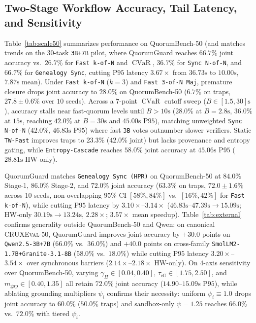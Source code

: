 \documentclass[conference]{IEEEtran}
\def\QG{QuorumGuard}%
\def\QBench{QuorumBench-50}%
\theoremstyle{definition}
\theoremstyle{remark}
\newcommand{\QG}{\textsc{QuorumGuard}}
\newcommand{\QBench}{\textsc{QuorumBench-50}}
\newcommand{\CVaR}{\operatorname{CVaR}}
\begin{document}
\subsection{Two-Stage Workflow Accuracy, Tail Latency, and Sensitivity}
Table~\ref{tab:scale50} summarizes performance on \QBench{} (and matches trends on the 30-task \texttt{3B+7B} pilot, where \QG{} reaches $66.7\%$ joint accuracy vs.\ $26.7\%$ for \texttt{Fast k-of-N} and $\CVaR$, $36.7\%$ for \texttt{Sync N-of-N}, and $66.7\%$ for \texttt{Genealogy Sync}, cutting $\mathrm{P95}$ latency $3.67\times$ from $36.73\text{s}$ to $10.00\text{s}$, $7.87\text{s}$ mean). Under \texttt{Fast k-of-N} ($k = 3$) and \texttt{Fast 3-of-N Maj}, premature closure drops joint accuracy to $28.0\%$ on \QBench{} ($6.7\%$ on traps, $27.8\pm 0.6\%$ over $10$ seeds). Across a $7$-point $\CVaR$ cutoff sweep ($B \in [1.5, 30]\text{s}$), accuracy stalls near fast-quorum levels until $B > 10\text{s}$ ($28.0\%$ at $B=2.8\text{s}$, $36.0\%$ at $15\text{s}$, reaching $42.0\%$ at $B=30\text{s}$ and $45.00\text{s}$ $\mathrm{P95}$), matching unweighted \texttt{Sync N-of-N} ($42.0\%$, $46.83\text{s}$ $\mathrm{P95}$) where fast \texttt{3B} votes outnumber slower verifiers. Static \texttt{TW-Fast} improves traps to $23.3\%$ ($42.0\%$ joint) but lacks provenance and entropy gating, while \texttt{Entropy-Cascade} reaches $58.0\%$ joint accuracy at $45.06\text{s}$ $\mathrm{P95}$ ($28.81\text{s}$ HW-only).

\QG{} matches \texttt{Genealogy Sync (HPR)} on \QBench{} at $84.0\%$ Stage-1, $86.0\%$ Stage-2, and $72.0\%$ joint accuracy ($63.3\%$ on traps, $72.0\pm 1.6\%$ across $10$ seeds, non-overlapping $95\%$ CI $[58\%, 84\%]$ vs.\ $[16\%, 42\%]$ for \texttt{Fast k-of-N}), while cutting $\mathrm{P95}$ latency by $3.10\times$--$3.14\times$ ($46.83\text{s}$--$47.39\text{s} \to 15.09\text{s}$; HW-only $30.19\text{s} \to 13.24\text{s}$, $2.28\times$; $3.57\times$ mean speedup). Table~\ref{tab:external} confirms generality outside \QBench{} and Qwen: on canonical \textsc{CRUXEval-50}, \QG{} improves joint accuracy by $+30.0$ points on \texttt{Qwen2.5-3B+7B} ($66.0\%$ vs.\ $36.0\%$) and $+40.0$ points on cross-family \texttt{SmolLM2-1.7B+Granite-3.1-8B} ($58.0\%$ vs.\ $18.0\%$) while cutting $\mathrm{P95}$ latency $3.20\times$--$3.54\times$ over synchronous barriers ($2.14\times$--$2.18\times$ HW-only). On $4$-axis sensitivity over \QBench{}, varying $\gamma_H \in [0.04, 0.40]$, $\tau_{\mathrm{eff}} \in [1.75, 2.50]$, and $m_{\mathrm{gap}} \in [0.40, 1.35]$ all retain $72.0\%$ joint accuracy ($14.90$--$15.09\text{s}$ $\mathrm{P95}$), while ablating grounding multipliers $\psi_i$ confirms their necessity: uniform $\psi_i \equiv 1.0$ drops joint accuracy to $60.0\%$ ($50.0\%$ traps) and sandbox-only $\psi = 1.25$ reaches $66.0\%$ vs.\ $72.0\%$ with tiered $\psi_i$.
\end{document}
